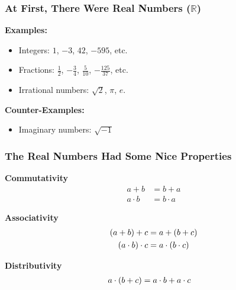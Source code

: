 \begin{frame}

\frametitle{At First, There Were Real Numbers ($\mathbb{R}$)}

\vspace{\fill}

\textbf{Examples:}

\begin{itemize}

\item Integers: $1$, $-3$, $42$, $-595$, etc.

\item Fractions: $\frac{1}{2}$, $-\frac{3}{4}$, $\frac{5}{10}$,
$-\frac{125}{37}$, etc.

\item Irrational numbers: $\sqrt{2}$, $\pi$, $e$.

\end{itemize}

\textbf{Counter-Examples:}

\begin{itemize}

\item Imaginary numbers: $\sqrt{-1}$

\end{itemize}

\end{frame}

\begin{frame}

\frametitle{The Real Numbers Had Some Nice Properties}

\vspace{\fill}

\begin{center}

\begin{minipage}{0.5\textwidth}
\begin{center}
\textbf{Commutativity} \begin{align*}
a + b &= b + a \\
a \cdot b &= b \cdot a
\end{align*}
\end{center}
\end{minipage}%
\begin{minipage}{0.5\textwidth}
\begin{center}
\textbf{Associativity} \begin{align*}
 \mathopen{}\left(a + b\right)\mathclose{}  + c &= a +  \mathopen{}\left(b + c\right)\mathclose{}  \\
 \mathopen{}\left(a \cdot b\right)\mathclose{}  \cdot c &= a \cdot  \mathopen{}\left(b \cdot c\right)\mathclose{} 
\end{align*}
\end{center}
\end{minipage}

\vspace{\fill}

\textbf{Distributivity} \begin{align*}
a \cdot  \mathopen{}\left(b + c\right)\mathclose{}  &= a \cdot b + a \cdot c
\end{align*}

\end{center}

\vspace{\fill}

\end{frame}
